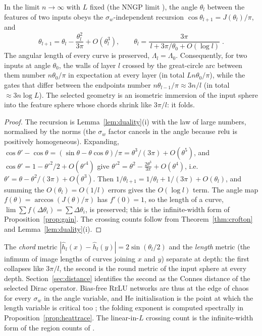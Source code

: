 \begin{theorem}\label{thm:folding}
In the limit $n\to\infty$ with $L$ fixed (the NNGP limit \cite{CS,PLRSG}), the angle $\theta_l$ between the features
of two inputs obeys the $\sigma_w$-independent recursion $\cos\theta_{l+1}=J(\theta_l)/\pi$, and
\[
\theta_{l+1}=\theta_l-\frac{\theta_l^2}{3\pi}+O(\theta_l^3),\qquad
\theta_l=\frac{3\pi}{\,l+3\pi/\theta_0+O(\log l)}\;.
\]
The angular length of every curve is preserved, $\Lambda_l=\Lambda_0$. Consequently, for two inputs at angle
$\theta_0$, the walls of layer $l$ crossed by the great-circle arc between them number $n\theta_0/\pi$ in
expectation at every layer (in total $L n\theta_0/\pi$), while the gates that differ between the endpoints number
$n\theta_{l-1}/\pi\approx3n/l$ (in total $\approx3n\log L$). The selected geometry is an isometric immersion of the
input sphere into the feature sphere whose chords shrink like $3\pi/l$: it folds.
\end{theorem}
\begin{proof}
The recursion is Lemma~\ref{lem:duality}(i) with the law of large numbers, normalised by the norms (the $\sigma_w$
factor cancels in the angle because $\operatorname{relu}$ is positively homogeneous). Expanding,
$\cos\theta'-\cos\theta=(\sin\theta-\theta\cos\theta)/\pi=\theta^3/(3\pi)+O(\theta^5)$, and
$\cos\theta'=1-\theta'^2/2+O(\theta'^4)$ give $\theta'^2=\theta^2-\tfrac{2\theta^3}{3\pi}+O(\theta^4)$, i.e.\
$\theta'=\theta-\theta^2/(3\pi)+O(\theta^3)$. Then $1/\theta_{l+1}=1/\theta_l+1/(3\pi)+O(\theta_l)$, and summing the
$O(\theta_l)=O(1/l)$ errors gives the $O(\log l)$ term. The angle map $f(\theta)=\arccos(J(\theta)/\pi)$ has
$f'(0)=1$, so the length of a curve, $\lim\sum f(\Delta\theta_i)=\sum\Delta\theta_i$, is preserved; this is the
infinite-width form of Proposition~\ref{prop:gain}. The crossing counts follow from Theorem~\ref{thm:crofton} and
Lemma~\ref{lem:duality}(i).
\end{proof}

\begin{remark}
The \emph{chord} metric $|\hat h_l(x)-\hat h_l(y)|=2\sin(\theta_l/2)$ and the \emph{length} metric (the infimum of
image lengths of curves joining $x$ and $y$) separate at depth: the first collapses like $3\pi/l$, the second is
the round metric of the input sphere at every depth. Section~\ref{sec:distance} identifies the second as the
Connes distance of the selected Dirac operator. Bias-free \textsc{ReLU} networks are thus at the edge of chaos for
every $\sigma_w$ in the angle variable, and He initialisation is the point at which the length variable is critical too
\cite{PLRSG,HDR}; the folding exponent is computed spectrally in Proposition~\ref{prop:heattrace}. The linear-in-$L$
crossing count is the infinite-width form of the region counts of \cite{HR}.
\end{remark}

